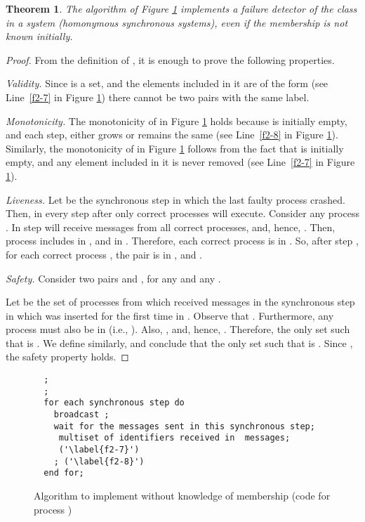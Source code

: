 \documentclass[10pt, conference, compsocconf]{IEEEtran}
\newtheorem{theorem}{Theorem}
\begin{document}
   
\begin{theorem}
The algorithm of Figure \ref{Fig-HS} implements a failure detector 
of the class  in a system  (homonymous 
synchronous systems), even if the membership is not known initially.
\end{theorem}
\begin{proof}
From the definition of , it is enough to prove the following properties.

\emph{Validity.}
Since  is a set, and the elements included in it are of the 
form  (see Line~\ref{f2-7} in Figure \ref{Fig-HS}) there cannot 
be two pairs with the same label.
   
\emph{Monotonicity.}
The monotonicity of  in Figure \ref{Fig-HS} holds because 
 is initially empty, and 
each step,  either grows or remains the same 
(see Line~\ref{f2-8} in Figure \ref{Fig-HS}). 
Similarly, the monotonicity of  in Figure \ref{Fig-HS} 
follows from the fact that  is 
initially empty, and any element  included in it is 
never removed (see Line~\ref{f2-7} in Figure \ref{Fig-HS}).

\emph{Liveness.}
Let  be the synchronous step in which the last faulty process crashed. 
Then, in every step  after  only correct processes will execute. 
Consider any process . In step  will receive messages 
from all correct 
processes, and, hence, . 
Then, process  includes  in , and  in  
. Therefore, each correct process  is in . 
So, after step , for each correct process , the pair  
is in , and . 
 
\emph{Safety.}
Consider two pairs  and 
, 
for any  and any . 

Let  be the set of processes from which  received 
 messages in the synchronous step in which
  was inserted for the first time in  . 
Observe that . 
Furthermore, any process  must also be in  
(i.e., ). Also, , and,  
hence, . Therefore, the only set  
such that  is .  We define  similarly, 
and conclude that the only set  such that 
 is . Since
, the safety property holds. 
\end{proof}


\begin{figure}
\begin{lstlisting}
  ;
  ;
  for each synchronous step do
    broadcast ;
    wait for the messages sent in this synchronous step; 
     multiset of identifiers received in  messages;
     ('\label{f2-7}')
    ; ('\label{f2-8}')
  end for;
\end{lstlisting}		
\caption{Algorithm to implement  without knowledge of membership 
(code for process )}
\label{Fig-HS}
\end{figure}
\end{document}
